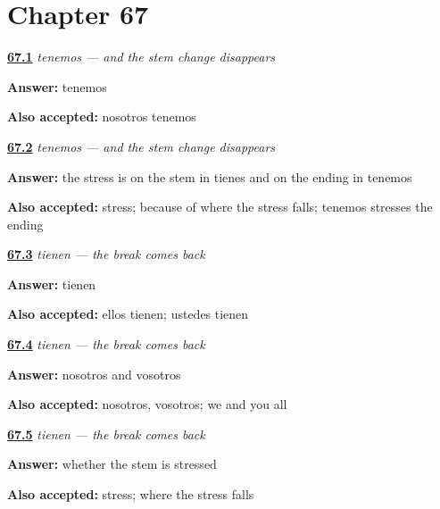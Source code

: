 \section*{Chapter 67}

\noindent\begin{minipage}[t]{\linewidth}
\raggedright
\hyperlink{review-ES-C08-tenemos-form}{\textbf{67.1}} \emph{tenemos — and the stem change disappears}\par
\small \textbf{Answer:} tenemos\par
\footnotesize \textbf{Also accepted:} nosotros tenemos
\end{minipage}\par\medskip

\noindent\begin{minipage}[t]{\linewidth}
\raggedright
\hyperlink{review-ES-C08-tenemos-why}{\textbf{67.2}} \emph{tenemos — and the stem change disappears}\par
\small \textbf{Answer:} the stress is on the stem in tienes and on the ending in tenemos\par
\footnotesize \textbf{Also accepted:} stress; because of where the stress falls; tenemos stresses the ending
\end{minipage}\par\medskip

\noindent\begin{minipage}[t]{\linewidth}
\raggedright
\hyperlink{review-ES-C08-tienen-form}{\textbf{67.3}} \emph{tienen — the break comes back}\par
\small \textbf{Answer:} tienen\par
\footnotesize \textbf{Also accepted:} ellos tienen; ustedes tienen
\end{minipage}\par\medskip

\noindent\begin{minipage}[t]{\linewidth}
\raggedright
\hyperlink{review-ES-C08-tienen-rule}{\textbf{67.4}} \emph{tienen — the break comes back}\par
\small \textbf{Answer:} nosotros and vosotros\par
\footnotesize \textbf{Also accepted:} nosotros, vosotros; we and you all
\end{minipage}\par\medskip

\noindent\begin{minipage}[t]{\linewidth}
\raggedright
\hyperlink{review-ES-C08-tienen-boot}{\textbf{67.5}} \emph{tienen — the break comes back}\par
\small \textbf{Answer:} whether the stem is stressed\par
\footnotesize \textbf{Also accepted:} stress; where the stress falls
\end{minipage}\par\medskip

